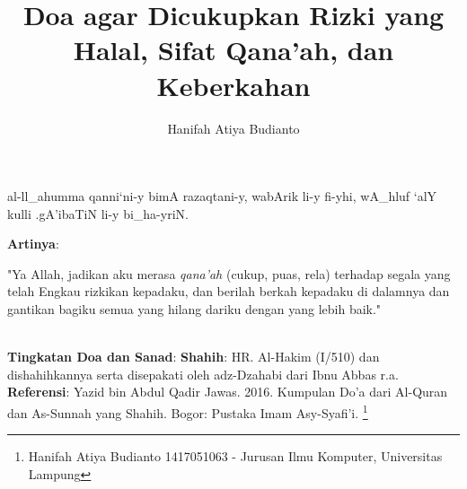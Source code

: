 \documentclass[a4paper,12pt]{article}
\title{\Large Doa agar Dicukupkan Rizki yang Halal, Sifat Qana'ah, dan
Keberkahan}
\author{\calligra Hanifah Atiya Budianto}
\begin{document}
\sffamily
\maketitle 
\fullvocalize
{}
\begin{arabtext}
\noindent
al-ll_ahumma qanni`ni-y bimA razaqtani-y, wabArik li-y fi-yhi, wA_hluf `alY 
kulli .gA'ibaTiN li-y bi_ha-yriN.\\
\end{arabtext}
\noindent
\textbf{Artinya}:
\par
\indent
"Ya Allah, jadikan aku merasa \textit{qana'ah} (cukup, puas, rela) terhadap
segala yang telah Engkau rizkikan kepadaku, dan berilah berkah kepadaku di 
dalamnya dan gantikan bagiku semua yang hilang dariku dengan yang lebih 
baik."\\\\
\par
\noindent
\textbf{Tingkatan Doa dan Sanad}: \textbf{Shahih}: HR. Al-Hakim (I/510) dan
dishahihkannya serta disepakati oleh adz-Dzahabi dari Ibnu Abbas r.a.\\
\textbf{Referensi}: Yazid bin Abdul Qadir Jawas. 2016. Kumpulan Do'a dari
Al-Quran dan As-Sunnah yang Shahih. Bogor: Pustaka Imam Asy-Syafi'i.
\footnote{Hanifah Atiya Budianto 1417051063 - Jurusan Ilmu Komputer,
Universitas Lampung}
\end{document}
